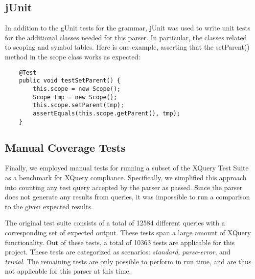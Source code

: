 \subsection{jUnit}
In addition to the gUnit tests for the grammar, jUnit was used to write unit tests for
the additional classes needed for this parser. In particular, the classes
related to scoping and symbol tables. Here is one example, asserting that the
setParent() method in the scope class works as expected:
\begin{Verbatim}
    @Test
    public void testSetParent() {
        this.scope = new Scope();
        Scope tmp = new Scope();
        this.scope.setParent(tmp);
        assertEquals(this.scope.getParent(), tmp);
    }
\end{Verbatim}

\subsection{Manual Coverage Tests}
Finally, we employed manual tests for running a subset of the XQuery Test
Suite\cite{w3c05} as a benchmark for XQuery compliance. Specifically, we
simplified this approach into counting any test query accepted by the parser as
passed. Since the parser does not generate any results from queries, it was
impossible to run a comparison to the given expected results.

The original test suite consists of a total of 12584 different queries with a
corresponding set of expected output. These tests span a large amount of XQuery
functionality. Out of these tests, a total of 10363 tests are applicable for
this project. These tests are categorized as scenarios: \emph{standard}, 
\emph{parse-error}, and \emph{trivial}. The remaining tests are only possible to
perform in run time, and are thus not applicable for this parser at this time.